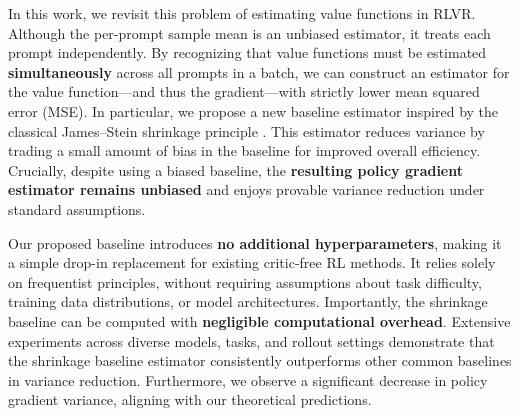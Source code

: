 \documentclass{article}
\makeatletter
\theoremstyle{plain}
\theoremstyle{definition}
\theoremstyle{remark}
\newlength{\secvspace}
\let\originalsection\section
\renewcommand{\section}{\@ifstar{\@sectionstar}{\@sectionnormal}}
\newcommand{\@sectionnormal}[1]{%
  \vspace{-\secvspace}%
  \originalsection{#1}%
  \vspace{-\secvspace}%
}
\newcommand{\@sectionstar}[1]{%
  \vspace{-\secvspace}%
  \originalsection*{#1}%
  \vspace{-\secvspace}%
}
\makeatother
\begin{document}
  In this work, we revisit this problem of estimating value functions in RLVR. Although the per-prompt sample mean is an unbiased estimator, it treats each prompt independently. By recognizing that value functions must be estimated \textbf{simultaneously} across all prompts in a batch, we can construct an estimator for the value function---and thus the gradient---with strictly lower mean squared error (MSE). In particular, we propose a new baseline estimator inspired by the classical James–Stein shrinkage principle \citep{james1961estimation, stein1956inadmissibility}. This estimator reduces variance by trading a small amount of bias in the baseline for improved overall efficiency. Crucially, despite using a biased baseline, the \textbf{resulting policy gradient estimator remains unbiased} and enjoys provable variance reduction under standard assumptions. 
  
  Our proposed baseline introduces \textbf{no additional hyperparameters}, making it a simple drop-in replacement for existing critic-free RL methods. It relies solely on frequentist principles, without requiring assumptions about task difficulty, training data distributions, or model architectures. Importantly, the shrinkage baseline can be computed with \textbf{negligible computational overhead}. Extensive experiments across diverse models, tasks, and rollout settings demonstrate that the shrinkage baseline estimator consistently outperforms other common baselines in variance reduction. Furthermore, we observe a significant decrease in policy gradient variance, aligning with our theoretical predictions.  

\section{Preliminaries}
  
\label{sec:preliminary}
  
\end{document}
